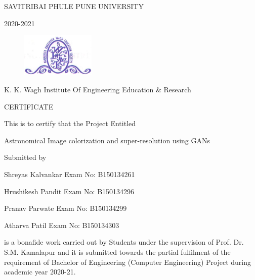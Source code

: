 \documentclass[oneside,a4paper,12pt]{report}
\begin{document}
\newpage



{\bfseries \fontsize{12}{12} \selectfont \centerline{SAVITRIBAI PHULE PUNE UNIVERSITY }
}

{\bfseries \fontsize{12}{12} \selectfont \centerline{2020-2021}
\vspace*{1\baselineskip}}

\begin{figure}[ht]
\centering
\includegraphics[width=100pt]{collegelogo.png}
\end{figure}

{\bfseries \fontsize{14}{12} \selectfont \centerline{K. K. Wagh Institute Of Engineering Education \& Research}
\vspace*{1\baselineskip}} 


{\bfseries \fontsize{14}{12} \selectfont \centerline{CERTIFICATE} 
} 

\centerline{This is to certify that the Project Entitled}
\vspace*{1\baselineskip} 


{\bfseries \fontsize{14}{12} \selectfont \centerline{Astronomical Image colorization and super-resolution using GANs}
\vspace*{1\baselineskip}}

\centerline{Submitted by}
\vspace*{1\baselineskip}
\centerline{Shreyas Kalvankar  \hspace{25 mm} Exam No: B150134261}
\centerline{Hrushikesh Pandit \hspace{26 mm} Exam No: B150134296 }
\centerline{Pranav Parwate \hspace{30 mm} Exam No: B150134299}
\centerline{Atharva Patil \hspace{34 mm} Exam No: B150134303}
\vspace*{1\baselineskip}
is a bonafide work carried out by Students under the supervision of Prof. Dr. S.M. Kamalapur and it is submitted towards the partial fulfilment of the requirement of Bachelor of Engineering (Computer Engineering) Project during academic year 2020-21.\\
\end{document}
